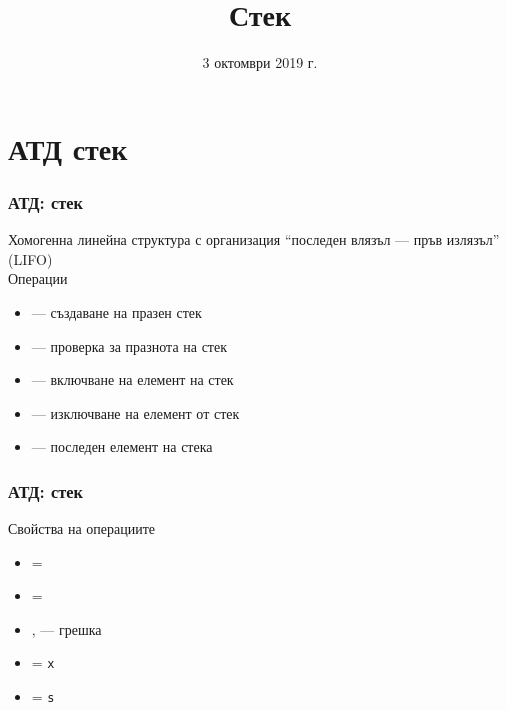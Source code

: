 \documentclass[alsotrans]{beamerswitch}
\title{Стек}
\date{3 октомври 2019 г.}
\begin{document}
\begin{frame}
  \titlepage
\end{frame}

\section{АТД стек}

\begin{frame}
  \frametitle{АТД: стек}

  Хомогенна линейна структура с организация ``последен влязъл --- пръв излязъл'' (LIFO)\\[1em]
  Операции\\[0.5em]
  \begin{itemize}
  \item {} --- създаване на празен стек
  \item {} --- проверка за празнота на стек
  \item {} --- включване на елемент на стек
  \item {} --- изключване на елемент от стек
  \item {} --- последен елемент на стека
  \end{itemize}
\end{frame}

\begin{frame}
  \frametitle{АТД: стек}

  Свойства на операциите\\[0.5em]
  \begin{itemize}
  \item {} = 
  \item {} = 
  \item {},  --- \alert{грешка}
  \item {} = \tt x
  \item {} = \tt s
  \end{itemize}
\end{frame}
\end{document}
